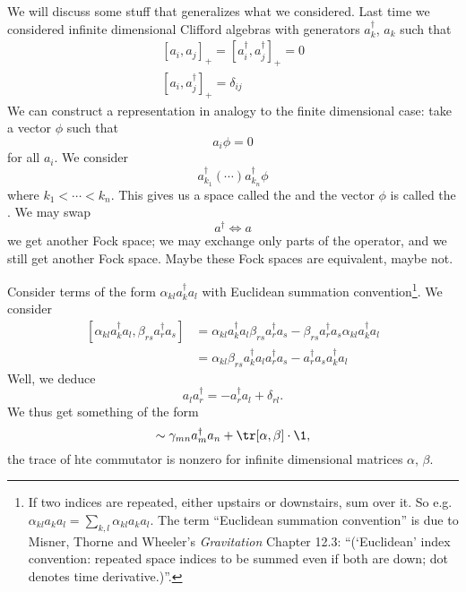 We will discuss some stuff that generalizes what we
considered. Last time we considered infinite dimensional Clifford
algebras with generators $a^{\dagger}_{k}$, $a_{k}$ such that
\begin{subequations}
\begin{align}
[a_{i},a_{j}]_{+} = [a^{\dagger}_{i}, a^{\dagger}_{j}]_{+} = 0\\
[a_{i}, a^{\dagger}_{j}]_{+} = \delta_{ij}
\end{align}
\end{subequations}
We can construct a representation in analogy to the finite
dimensional case: take a vector $\phi$ such that
\begin{equation}
a_{i}\phi = 0
\end{equation}
for all $a_{i}$. We consider
\begin{equation}
a^{\dagger}_{k_{1}}(\cdots)a^{\dagger}_{k_{n}}\phi
\end{equation}
where $k_{1}<\cdots<k_{n}$. This gives us a space called the
 and the vector $\phi$ is called the
. We may swap
\begin{equation}
a^{\dagger}\iff a
\end{equation}
we get another Fock space; we may exchange only parts of the
operator, and we still get another Fock space. Maybe these Fock
spaces are equivalent, maybe not.

Consider terms of the form $\alpha_{kl}a^{\dagger}_{k}a_{l}$ with
Euclidean summation convention\footnote{If two indices are
  repeated, either upstairs or downstairs, sum over it. So
  e.g. $\alpha_{kl}a_{k}a_{l}=\sum_{k,l}\alpha_{kl}a_{k}a_{l}$. The
  term ``Euclidean summation convention'' is due to Misner,
  Thorne and Wheeler's \emph{Gravitation} Chapter 12.3:
  ``(`Euclidean' index convention: repeated space indices to be
  summed even if both are down; dot denotes time derivative.)''.}. We consider
\begin{subequations}
\begin{align}
[\alpha_{kl}a^{\dagger}_{k}a_{l}, \beta_{rs}a^{\dagger}_{r}a_{s}]
&= \alpha_{kl}a^{\dagger}_{k}a_{l}\beta_{rs}a^{\dagger}_{r}a_{s}
- \beta_{rs}a^{\dagger}_{r}a_{s}\alpha_{kl}a^{\dagger}_{k}a_{l}\\
&= \alpha_{kl}\beta_{rs}a^{\dagger}_{k}a_{l}a^{\dagger}_{r}a_{s}
- a^{\dagger}_{r}a_{s}a^{\dagger}_{k}a_{l}
\end{align}
\end{subequations}
Well, we deduce
\begin{equation}
a_{l}a^{\dagger}_{r} = -a^{\dagger}_{r}a_{l}+\delta_{rl}.
\end{equation}
We thus get something of the form
\begin{equation}
[\alpha_{kl}a^{\dagger}_{k}a_{l}, \beta_{rs}a^{\dagger}_{r}a_{s}]
\sim \gamma_{mn}a^{\dagger}_{m}a_{n}+\tr[\alpha,\beta]\cdot\1,
\end{equation}
the trace of hte commutator is nonzero for infinite dimensional
matrices $\alpha$, $\beta$.

